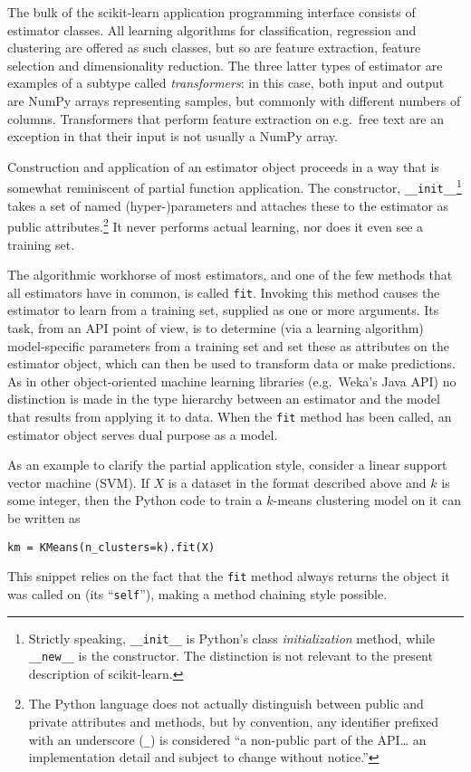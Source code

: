 \documentclass[a4paper,twocolumn]{article}
\begin{document}

The bulk of the scikit-learn application programming interface
consists of estimator classes.
All learning algorithms for classification, regression and clustering
are offered as such classes,
but so are feature extraction, feature selection and dimensionality reduction.
The three latter types of estimator are examples of a subtype
called \textit{transformers}:
in this case, both input and output are NumPy arrays representing samples,
but commonly with different numbers of columns.
Transformers that perform feature extraction on e.g.\ free text
are an exception in that their input is not usually a NumPy array.

Construction and application of an estimator object
proceeds in a way that is somewhat reminiscent of partial function application.
The constructor, \texttt{\_\_init\_\_}\footnote{
  Strictly speaking, \texttt{\_\_init\_\_} is Python's
  class \textit{initialization} method,
  while \texttt{\_\_new\_\_} is the constructor.
  The distinction is not relevant to the present description of scikit-learn.}
takes a set of named (hyper-)parameters
and attaches these to the estimator as public attributes.\footnote{
  The Python language does not actually distinguish between public and private
  attributes and methods,
  but by convention, any identifier prefixed with an underscore (\texttt{\_})
  is considered ``a non-public part of the API\ldots
  an implementation detail and subject to change without notice.''
  }
It never performs actual learning, nor does it even see a training set.

The algorithmic workhorse of most estimators, and one of the few methods
that all estimators have in common, is called \texttt{fit}.
Invoking this method causes the estimator to learn from a training set,
supplied as one or more arguments.
Its task, from an API point of view,
is to determine (via a learning algorithm) model-specific parameters
from a training set and set these as attributes on the estimator object,
which can then be used to transform data or make predictions.
As in other object-oriented machine learning libraries
(e.g.\ Weka's Java API)
no distinction is made in the type hierarchy
between an estimator and the model that results from applying it to data.
When the \texttt{fit} method has been called,
an estimator object serves dual purpose as a model.

As an example to clarify the partial application style,
consider a linear support vector machine (SVM).
If $X$ is a dataset in the format described above and $k$ is some integer,
then the Python code to train a $k$-means clustering model on it
can be written as
\begin{verbatim}
km = KMeans(n_clusters=k).fit(X)
\end{verbatim}
This snippet relies on the fact that the \texttt{fit} method
always returns the object it was called on (its ``\texttt{self}''),
making a method chaining style possible.
\end{document}
